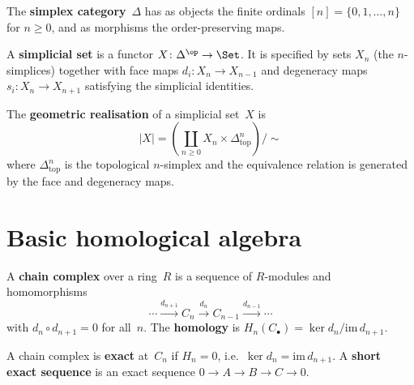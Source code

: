 \begin{definition}\label{def:app-simplex-cat}
The \textbf{simplex category}~$\Delta$ has as objects the finite
ordinals $[n] = \{0, 1, \ldots, n\}$ for $n\ge 0$, and as morphisms
the order-preserving maps.
\end{definition}

\begin{definition}\label{def:app-sset}
A \textbf{simplicial set} is a functor $X\colon\Delta^{\op}\to\Set$.
It is specified by sets $X_n$ (the $n$-simplices) together with
face maps $d_i\colon X_n\to X_{n-1}$ and degeneracy maps
$s_i\colon X_n\to X_{n+1}$ satisfying the simplicial identities.
\end{definition}

\begin{definition}\label{def:app-realisation}
The \textbf{geometric realisation} of a simplicial set~$X$ is
\[
    |X| = \left(\coprod_{n\ge 0} X_n\times\Delta^n_{\mathrm{top}}\right)
    \Big/ {\sim}
\]
where $\Delta^n_{\mathrm{top}}$ is the topological $n$-simplex
and the equivalence relation is generated by the face and degeneracy maps.
\end{definition}


\section{Basic homological algebra}\label{sec:app-homological}

\begin{definition}\label{def:app-chain-complex}
A \textbf{chain complex} over a ring~$R$ is a sequence of $R$-modules
and homomorphisms
\[
    \cdots \xrightarrow{d_{n+1}} C_n \xrightarrow{d_n} C_{n-1}
    \xrightarrow{d_{n-1}} \cdots
\]
with $d_n\circ d_{n+1} = 0$ for all~$n$.
The \textbf{homology} is $H_n(C_\bullet) = \ker d_n / \mathrm{im}\, d_{n+1}$.
\end{definition}

\begin{definition}\label{def:app-exact}
A chain complex is \textbf{exact} at~$C_n$ if $H_n = 0$, i.e.\
$\ker d_n = \mathrm{im}\, d_{n+1}$.  A \textbf{short exact sequence}
is an exact sequence $0\to A\to B\to C\to 0$.
\end{definition}

